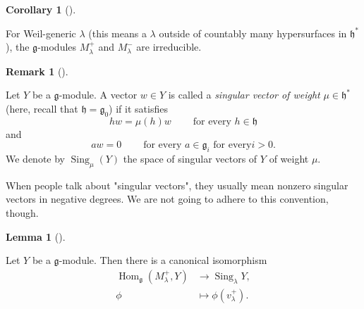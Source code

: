 \documentclass
[numbers=enddot,12pt,final,onecolumn,german,notitlepage]{scrartcl}%
\theoremstyle{definition}
\newtheorem{lem}[theo]{Lemma}
\newenvironment{lemma}[1][]
{\begin{lem}[#1]\begin{leftbar}}
{\end{leftbar}\end{lem}}
\newtheorem{remk}[theo]{Remark}
\newenvironment{remark}[1][]
{\begin{remk}[#1]\begin{leftbar}}
{\end{leftbar}\end{remk}}
\newtheorem{coro}[theo]{Corollary}
\newenvironment{corollary}[1][]
{\begin{coro}[#1]\begin{leftbar}}
{\end{leftbar}\end{coro}}
\begin{document}
\begin{corollary}
\label{cor.verma.irred}For Weil-generic $\lambda$ (this means a $\lambda$
outside of countably many hypersurfaces in $\mathfrak{h}^{\ast}$), the
$\mathfrak{g}$-modules $M_{\lambda}^{+}$ and $M_{\lambda}^{-}$ are irreducible.
\end{corollary}

\begin{remark}
Let $Y$ be a $\mathfrak{g}$-module. A vector $w\in Y$ is called a
\textit{singular vector of weight }$\mu\in\mathfrak{h}^{\ast}$ (here, recall
that $\mathfrak{h}=\mathfrak{g}_{0}$) if it satisfies%
\[
hw=\mu\left(  h\right)  w\ \ \ \ \ \ \ \ \ \ \text{for every }h\in\mathfrak{h}%
\]
and%
\[
aw=0\ \ \ \ \ \ \ \ \ \ \text{for every }a\in\mathfrak{g}_{i}\text{ for every
}i>0\text{.}%
\]
We denote by $\operatorname*{Sing}\nolimits_{\mu}\left(  Y\right)  $ the space
of singular vectors of $Y$ of weight $\mu$.
\end{remark}

When people talk about "singular vectors", they usually mean nonzero singular
vectors in negative degrees. We are not going to adhere to this convention, though.

\begin{lemma}
\label{lem.singvec}Let $Y$ be a $\mathfrak{g}$-module. Then there is a
canonical isomorphism%
\begin{align*}
\operatorname*{Hom}\nolimits_{\mathfrak{g}}\left(  M_{\lambda}^{+},Y\right)
&  \rightarrow\operatorname*{Sing}\nolimits_{\lambda}Y,\\
\phi &  \mapsto\phi\left(  v_{\lambda}^{+}\right)  .
\end{align*}

\end{lemma}
\end{document}
